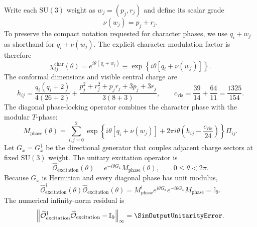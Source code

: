 Write each \(\mathrm{SU}(3)\) weight as \(w_j=(p_j,r_j)\) and define its scalar grade
\begin{equation}
  \nu(w_j)
  =
  p_j+r_j.
  \label{eq:su3-scalar-grade}
\end{equation}
To preserve the compact notation requested for character phases, we use \(q_i+w_j\) as shorthand for \(q_i+\nu(w_j)\).  The explicit character modulation factor is therefore
\begin{equation}
  \chi_{ij}^{\mathrm{char}}(\theta)
  =
  e^{i\theta(q_i+w_j)}
  \equiv
  \exp\left\{
    i\theta
    \left[
      q_i+\nu(w_j)
    \right]
  \right\}.
  \label{eq:explicit-character-phase}
\end{equation}
The conformal dimensions and visible central charge are
\begin{equation}
  h_{ij}
  =
  \frac{q_i(q_i+2)}{4(26+2)}
  +
  \frac{p_j^2+r_j^2+p_j r_j+3p_j+3r_j}
  {3(8+3)},
  \qquad
  c_{\mathrm{vis}}
  =
  \frac{39}{14}
  +
  \frac{64}{11}
  =
  \frac{1325}{154}.
  \label{eq:visible-conformal-data}
\end{equation}
The diagonal phase-locking operator combines the character phase with the modular \(T\)-phase:
\begin{equation}
  M_{\mathrm{phase}}(\theta)
  =
  \sum_{i,j=0}^{2}
  \exp\left\{
    i\theta[q_i+\nu(w_j)]
    +
    2\pi i\theta
    \left(
      h_{ij}-\frac{c_{\mathrm{vis}}}{24}
    \right)
  \right\}
  \Pi_{ij}.
  \label{eq:full-phase-locking-operator}
\end{equation}
Let \(G_x=G_x^\dagger\) be the directional generator that couples adjacent charge sectors at fixed \(\mathrm{SU}(3)\) weight.  The unitary excitation operator is
\begin{equation}
  \widehat{\mathcal O}_{\mathrm{excitation}}(\theta)
  =
  e^{-i\theta G_x}
  M_{\mathrm{phase}}(\theta),
  \qquad
  0\leq\theta<2\pi.
  \label{eq:unitary-excitation-operator}
\end{equation}
Because \(G_x\) is Hermitian and every diagonal phase has unit modulus,
\begin{equation}
  \widehat{\mathcal O}_{\mathrm{excitation}}^\dagger(\theta)
  \widehat{\mathcal O}_{\mathrm{excitation}}(\theta)
  =
  M_{\mathrm{phase}}^\dagger
  e^{i\theta G_x}
  e^{-i\theta G_x}
  M_{\mathrm{phase}}
  =
  \mathbb I_9.
  \label{eq:excitation-unitarity-proof}
\end{equation}
The numerical infinity-norm residual is
\begin{equation}
  \left\|
    \widehat{\mathcal O}_{\mathrm{excitation}}^\dagger
    \widehat{\mathcal O}_{\mathrm{excitation}}
    -
    \mathbb I_9
  \right\|_{\infty}
  =
  \SimOutputUnitarityError.
  \label{eq:excitation-unitarity-residual}
\end{equation}

